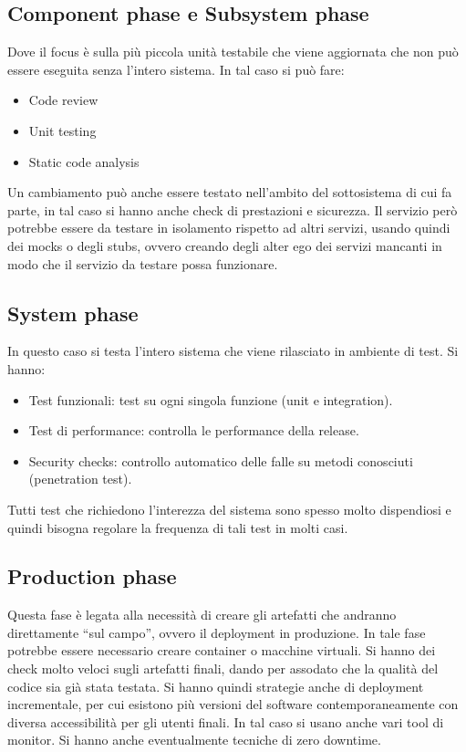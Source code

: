 \subsection{Component phase e Subsystem phase}
Dove il focus è sulla più piccola unità testabile che viene aggiornata che non
può essere eseguita senza l'intero sistema. In tal caso si può fare:
\begin{itemize}
      \item Code review
      \item Unit testing
      \item Static code analysis
\end{itemize}
Un cambiamento può anche essere testato nell'ambito del sottosistema di cui fa
parte, in tal caso si hanno anche check di prestazioni e sicurezza. Il servizio
però potrebbe essere da testare in isolamento rispetto ad altri servizi, usando
quindi dei mocks o degli stubs, ovvero creando degli alter ego dei servizi mancanti
in modo che il servizio da testare possa funzionare.
\subsection{System phase}
In questo caso si testa l'intero sistema che viene rilasciato in ambiente di test.
Si hanno:
\begin{itemize}
      \item Test funzionali: test su ogni singola funzione (unit e integration).
      \item Test di performance: controlla le performance della release.
      \item Security checks: controllo automatico delle falle su metodi conosciuti
            (penetration test).
\end{itemize}
Tutti test che richiedono l'interezza del sistema sono spesso molto dispendiosi
e quindi bisogna regolare la frequenza di tali test in molti casi.
\subsection{Production phase}
Questa fase è legata alla necessità di creare gli artefatti che andranno
direttamente “sul campo”, ovvero il deployment in produzione. In tale fase potrebbe
essere necessario creare container o macchine virtuali. Si hanno dei check molto
veloci sugli artefatti finali, dando per assodato che la qualità del codice sia
già stata testata. Si hanno quindi strategie anche di deployment incrementale, per
cui esistono più versioni del software contemporaneamente con diversa accessibilità
per gli utenti finali. In tal caso si usano anche vari tool di monitor. Si hanno
anche eventualmente tecniche di zero downtime.

